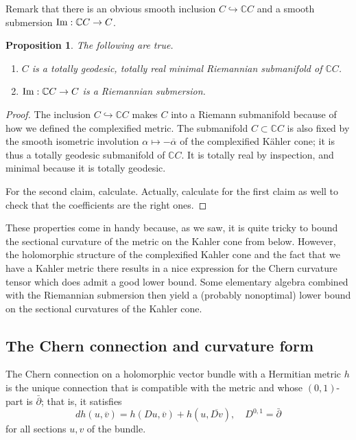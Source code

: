 \documentclass[11pt,a4paper]{amsart}
\newtheorem{prop}[theo]{Proposition}
\theoremstyle{definition}
\theoremstyle{remark}
\def\Im{\mathop{\rm Im}}
\def\ov#1{\overline{#1}}
\def\dbar{\bar\partial}
\def\chern{D}
\def\ckf{\alpha}
\def\ton{u}
\def\ttw{v}
\def\KC{C}
\def\CKC{\mathbb{C}C}
\begin{document}
Remark that there is an obvious smooth inclusion $\KC \hookrightarrow \CKC$
and a smooth submersion $\Im : \CKC \to \KC$.

\begin{prop}
The following are true.
\begin{enumerate}
    \item 
$\KC$ is a totally geodesic, totally real minimal Riemannian submanifold
of $\CKC$.  
    \item 
$\Im: \CKC \to \KC$ is a Riemannian submersion.
\end{enumerate}
\end{prop}

\begin{proof}
The inclusion $\KC \hookrightarrow \CKC$ makes $\KC$ into a Riemann
submanifold because of how we defined the complexified metric. The
submanifold $\KC \subset \CKC$ is also fixed by the smooth isometric
involution $\ckf \mapsto -\ov\ckf$ of the complexified K\"{a}hler cone;
it is thus a totally geodesic submanifold of $\CKC$. It is totally real
by inspection, and minimal because it is totally geodesic.

For the second claim, calculate. Actually, calculate for the first claim
as well to check that the coefficients are the right ones.
\end{proof}


These properties come in handy because, as we saw, it is quite tricky to
bound the sectional curvature of the metric on the Kahler cone from
below. However, the holomorphic structure of the complexified Kahler
cone and the fact that we have a Kahler metric there results in a
nice expression for the Chern curvature tensor which does admit a good
lower bound. Some elementary algebra combined with the Riemannian
submersion then yield a (probably nonoptimal) lower bound on the
sectional curvatures of the Kahler cone.



\subsection*{The Chern connection and curvature form}

The Chern connection on a holomorphic vector bundle with a Hermitian
metric $h$ is the unique connection that is compatible with the metric
and whose $(0,1)$-part is $\dbar$; that is, it satisfies
$$
d h(\ton, \ov{\ttw}) 
= h(\chern \ton, \ov{\ttw}) + h(\ton, \ov{\chern \ttw}),
\quad
\chern^{0,1} = \dbar
$$
for all sections $u, v$ of the bundle.
\end{document}
